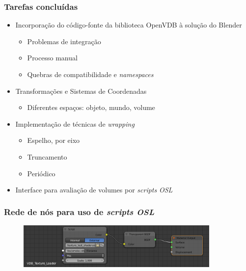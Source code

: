 \documentclass{beamer}
\begin{document}
\begin{frame}

\frametitle{Tarefas concluídas}

\begin{itemize}
\item Incorporação do código-fonte da biblioteca OpenVDB à solução do Blender
	\begin{itemize}
		\item Problemas de integração
		\item Processo manual
		\item Quebras de compatibilidade e \emph{namespaces}
	\end{itemize}
\item Transformações e Sistemas de Coordenadas
\begin{itemize}
		\item Diferentes espaços: objeto, mundo, volume
\end{itemize}
\item Implementação de técnicas de \emph{wrapping}
	\begin{itemize}
		\item Espelho, por eixo
		\item Truncamento
		\item Periódico
	\end{itemize}
\item Interface para avaliação de volumes por {\it scripts} \emph{OSL}
\end{itemize}

\end{frame}



\begin{frame}

\frametitle{Rede de nós para uso de {\it scripts OSL}}

\begin{figure}[!htb]
\center
\includegraphics[width=10cm]{vdb_node}
\end{figure}


\end{frame}
\end{document}
